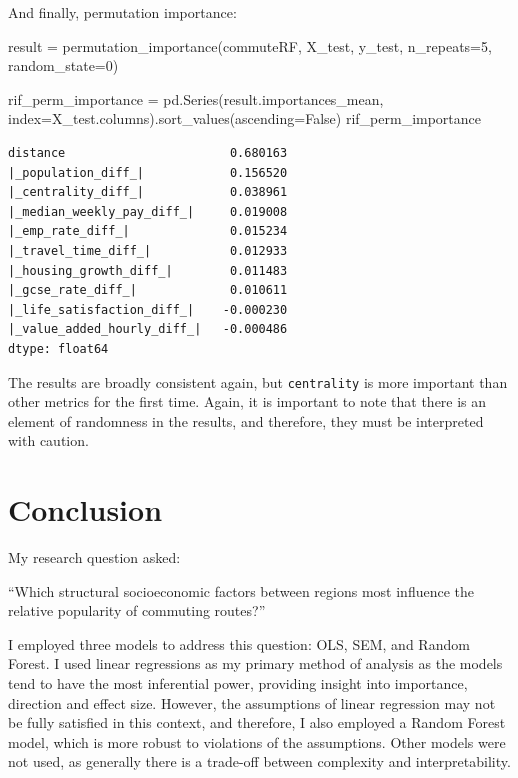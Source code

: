 \documentclass[
  number]{elsarticle}
\newenvironment{Shaded}{\begin{snugshade}}{\end{snugshade}}
\newcommand{\DecValTok}[1]{\textcolor[rgb]{0.68,0.00,0.00}{#1}}
\newcommand{\NormalTok}[1]{\textcolor[rgb]{0.00,0.23,0.31}{#1}}
\newcommand{\OperatorTok}[1]{\textcolor[rgb]{0.37,0.37,0.37}{#1}}
\newcommand{\VariableTok}[1]{\textcolor[rgb]{0.07,0.07,0.07}{#1}}
\begin{document}
And finally, permutation importance:

\begin{Shaded}
\begin{Highlighting}[]
\NormalTok{result }\OperatorTok{=}\NormalTok{ permutation\_importance(commuteRF, X\_test, y\_test,}
\NormalTok{                                 n\_repeats}\OperatorTok{=}\DecValTok{5}\NormalTok{,}
\NormalTok{                                 random\_state}\OperatorTok{=}\DecValTok{0}\NormalTok{)}

\NormalTok{rif\_perm\_importance }\OperatorTok{=}\NormalTok{ pd.Series(result.importances\_mean, index}\OperatorTok{=}\NormalTok{X\_test.columns).sort\_values(ascending}\OperatorTok{=}\VariableTok{False}\NormalTok{)}
\NormalTok{rif\_perm\_importance}
\end{Highlighting}
\end{Shaded}

\begin{verbatim}
distance                       0.680163
|_population_diff_|            0.156520
|_centrality_diff_|            0.038961
|_median_weekly_pay_diff_|     0.019008
|_emp_rate_diff_|              0.015234
|_travel_time_diff_|           0.012933
|_housing_growth_diff_|        0.011483
|_gcse_rate_diff_|             0.010611
|_life_satisfaction_diff_|    -0.000230
|_value_added_hourly_diff_|   -0.000486
dtype: float64
\end{verbatim}

The results are broadly consistent again, but
\texttt{\textquotesingle{}centrality\textquotesingle{}} is more
important than other metrics for the first time. Again, it is important
to note that there is an element of randomness in the results, and
therefore, they must be interpreted with caution.

\section{Conclusion}\label{sec-conclusion}

My research question asked:

``Which structural socioeconomic factors between regions most influence
the relative popularity of commuting routes?''

I employed three models to address this question: OLS, SEM, and Random
Forest. I used linear regressions as my primary method of analysis as
the models tend to have the most inferential power, providing insight
into importance, direction and effect size. However, the assumptions of
linear regression may not be fully satisfied in this context, and
therefore, I also employed a Random Forest model, which is more robust
to violations of the assumptions. Other models were not used, as
generally there is a trade-off between complexity and interpretability.
\end{document}
